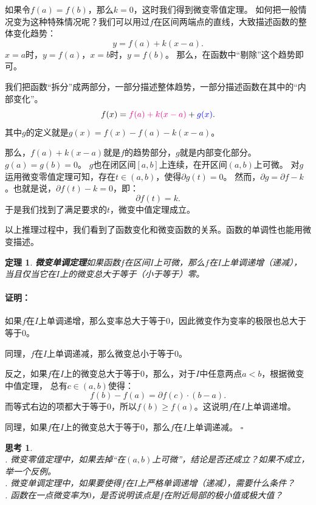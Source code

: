 \documentclass[12pt,UTF8]{ctexbook}
\renewenvironment{proof}{\paragraph{\textbf{证明：}}}{\hfill$\square$}
\newtheorem{tm}{定理}[section]
\newtheorem{sk}{思考}[section]
\begin{document}
如果令$f(a) = f(b)$，那么$k=0$，这时我们得到微变零值定理。
如何把一般情况变为这种特殊情况呢？我们可以用过$f$在区间两端点的直线，大致描述函数的整体变化趋势：
$$ y = f(a) + k(x - a).$$
$x = a$时，$y = f(a)$，$x = b$时，$y = f(b)$。
那么，在函数中“剔除”这个趋势即可。

我们把函数“拆分”成两部分，一部分描述整体趋势，一部分描述函数在其中的“内部变化”。
$$ f(x) = {\color{magenta} f(a) + k(x - a)} + {\color{blue} g(x)}. $$
其中$g$的定义就是$g(x) = f(x) - f(a) - k(x - a)$。

那么，$f(a) + k(x - a)$就是$f$的趋势部分，$g$就是内部变化部分。$g(a) = g(b) = 0$。
$g$也在闭区间$[a, b]$上连续，在开区间$(a, b)$上可微。
对$g$运用微变零值定理可知，存在$t\in(a,b)$，使得$\partial g(t) = 0$。
然而，$\partial g = \partial f - k$。也就是说，$ \partial f(t) - k = 0$，即：
$$ \partial f(t) = k.$$
于是我们找到了满足要求的$t$，微变中值定理成立。

以上推理过程中，我们看到了函数变化和微变函数的关系。函数的单调性也能用微变描述。
\begin{tm}{\textbf{微变单调定理}}\label{tm:2-4-20}
    如果函数$f$在区间$I$上可微，那么$f$在$I$上单调递增（递减），
    当且仅当它在$I$上的微变总大于等于（小于等于）零。
\end{tm}

\begin{proof}
    如果$f$在$I$上单调递增，那么变率总大于等于$0$，因此微变作为变率的极限也总大于等于$0$。
    
    同理，$f$在$I$上单调递减，那么微变总小于等于$0$。

    反之，如果$f$在$I$上的微变总大于等于$0$，那么，对于$I$中任意两点$a < b$，根据微变中值定理，
    总有$c\in(a, b)$使得：
    $$f(b) - f(a) = \partial f(c) \cdot (b - a).$$
    而等式右边的项都大于等于$0$，所以$f(b) \geqslant f(a)$。这说明$f$在$I$上单调递增。
    
    同理，如果$f$在$I$上的微变总大于等于$0$，那么$f$在$I$上单调递减。
\end{proof}

\begin{sk}
    \mbox{} \\
    . 微变零值定理中，如果去掉“在$(a, b)$上可微”，结论是否还成立？如果不成立，举一个反例。\\
    . 微变单调定理中，如果要使得$f$在$I$上严格单调递增（递减），需要什么条件？\\
    . 函数在一点微变率为$0$，是否说明该点是$f$在附近局部的极小值或极大值？
\end{sk}
\end{document}
